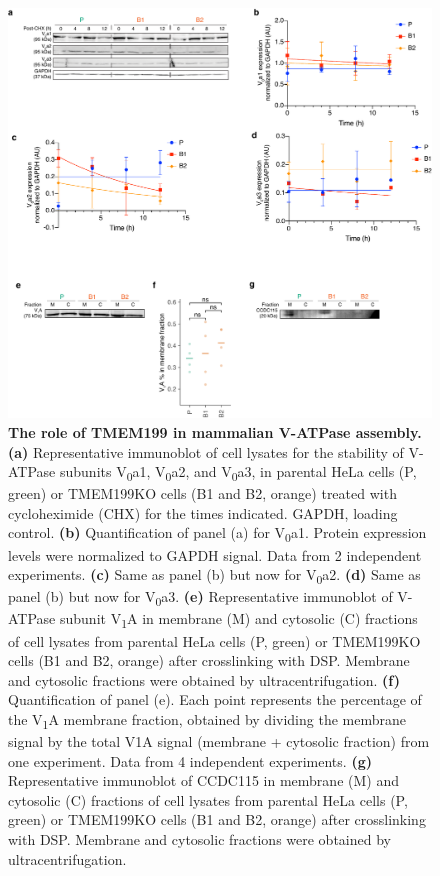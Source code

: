 \begin{figure}
    \includegraphics[keepaspectratio=true,width=\textwidth,height=\textheight]{chapters/chapter4/chapter4_Figure5.pdf}
    \caption{\textbf{The role of TMEM199 in mammalian V-ATPase assembly.} \textbf{(a)} Representative immunoblot of cell lysates for the stability of V-ATPase subunits V\textsubscript{0}a1, V\textsubscript{0}a2, and V\textsubscript{0}a3, in parental HeLa cells (P, green) or TMEM199KO cells (B1 and B2, orange) treated with cycloheximide (CHX) for the times indicated. GAPDH, loading control. \textbf{(b)} Quantification of panel (a) for V\textsubscript{0}a1. Protein expression levels were normalized to GAPDH signal. Data from 2 independent experiments. \textbf{(c)} Same as panel (b) but now for V\textsubscript{0}a2. \textbf{(d)} Same as panel (b) but now for V\textsubscript{0}a3. \textbf{(e)} Representative immunoblot of V-ATPase subunit V\textsubscript{1}A in membrane (M) and cytosolic (C) fractions of cell lysates from parental HeLa cells (P, green) or TMEM199KO cells (B1 and B2, orange) after crosslinking with DSP. Membrane and cytosolic fractions were obtained by ultracentrifugation. \textbf{(f)} Quantification of panel (e). Each point represents the percentage of the V\textsubscript{1}A membrane fraction, obtained by dividing the membrane signal by the total V1A signal (membrane + cytosolic fraction) from one experiment. Data from 4 independent experiments. \textbf{(g)} Representative immunoblot of CCDC115 in membrane (M) and cytosolic (C) fractions of cell lysates from parental HeLa cells (P, green) or TMEM199KO cells (B1 and B2, orange) after crosslinking with DSP. Membrane and cytosolic fractions were obtained by ultracentrifugation.}
    \label{fig:ch4fig5}
\end{figure}

